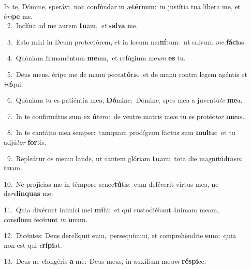 \lettrine{\initial\textcolor{\initialcolor}{I}}{n} te, Dómine, sperávi, non confúndar in æ\-\textbf{tér}\-num:~\star in justítia tua líbera me, et é\-\textit{ri}\-\textbf{pe} me.\\
{\numbfont\textcolor{\numbcolor}{~2.}}~Inclína ad me aurem \textbf{tu}\-am,~\star \textit{et} \textbf{sal}\-\textbf{va} me.\par
{\numbfont\textcolor{\numbcolor}{~3.}}~Esto mihi in Deum protectórem, et in locum mu\-\textbf{ní}\-tum:~\star ut salvum \textit{me} \textbf{fá}\-\textbf{ci}as.\par
{\numbfont\textcolor{\numbcolor}{~4.}}~Quóniam firmaméntum \textbf{me}\-um,~\star et refúgium me\textit{um} \textbf{es} tu.\par
{\numbfont\textcolor{\numbcolor}{~5.}}~Deus meus, éripe me de manu pecca\-\textbf{tó}\-ris,~\star et de manu contra legem agéntis et \textit{in}\-\textbf{í}qui:\par
{\numbfont\textcolor{\numbcolor}{~6.}}~Quóniam tu es patiéntia mea, \textbf{Dó}\-mine:~\star Dómine, spes mea a juventú\textit{te} \textbf{me}\-a.\par
{\numbfont\textcolor{\numbcolor}{~7.}}~In te confirmátus sum ex \textbf{ú}\-tero:~\star de ventre matris meæ tu es protéc\textit{tor} \textbf{me}\-us.\par
{\numbfont\textcolor{\numbcolor}{~8.}}~In te cantátio mea semper:~\dagger tamquam prodígium factus sum \textbf{mul}\-tis:~\star et tu adjú\textit{tor} \textbf{for}\-tis.\par
{\numbfont\textcolor{\numbcolor}{~9.}}~Repleátur os meum laude, ut cantem glóriam \textbf{tu}\-am:~\star tota die magnitúdi\textit{nem} \textbf{tu}\-am.\par
{\numbfont\textcolor{\numbcolor}{10.}}~Ne projícias me in témpore senec\-\textbf{tú}\-tis:~\star cum defécerit virtus mea, ne de\-\textit{re}\-\textbf{lín}\textbf{quas} me.\par
{\numbfont\textcolor{\numbcolor}{11.}}~Quia dixérunt inimíci mei \textbf{mi}\-hi:~\star et qui custodiébant ánimam meam, consílium fecérunt \textit{in} \textbf{u}\-num.\par
{\numbfont\textcolor{\numbcolor}{12.}}~Dicéntes: Deus derelíquit eum,~\dagger persequímini, et comprehéndite \textbf{e}\-um:~\star quia non est qui \textit{e}\-\textbf{rí}\textbf{pi}at.\par
{\numbfont\textcolor{\numbcolor}{13.}}~Deus ne elongéris \textbf{a} me:~\star Deus meus, in auxílium me\textit{um} \textbf{ré}\-\textbf{spi}ce.\par
